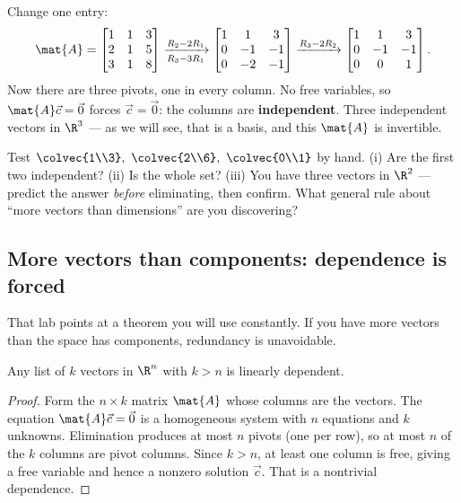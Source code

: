 \begin{example}
\label{ch14:ex-indep3}
Change one entry:
\[
  \mat{A}=\begin{bmatrix} 1 & 1 & 3\\ 2 & 1 & 5\\ 3 & 1 & 8\end{bmatrix}
  \xrightarrow[R_3-3R_1]{R_2-2R_1}
  \begin{bmatrix} 1 & 1 & 3\\ 0 & -1 & -1\\ 0 & -2 & -1\end{bmatrix}
  \xrightarrow{R_3-2R_2}
  \begin{bmatrix} 1 & 1 & 3\\ 0 & -1 & -1\\ 0 & 0 & 1\end{bmatrix}.
\]
Now there are three pivots, one in every column. No free variables, so
$\mat{A}\vec{c}=\vec{0}$ forces $\vec{c}=\vec{0}$: the columns are
\textbf{independent}. Three independent vectors in $\R^3$ --- as we will see,
that is a basis, and this $\mat{A}$ is invertible.
\end{example}

\begin{labbox}
Test $\colvec{1\\3},\ \colvec{2\\6},\ \colvec{0\\1}$ by hand. (i) Are the first
two independent? (ii) Is the whole set? (iii) You have three vectors in $\R^2$ ---
predict the answer \emph{before} eliminating, then confirm. What general rule
about ``more vectors than dimensions'' are you discovering?
\end{labbox}

\subsection*{More vectors than components: dependence is forced}

That lab points at a theorem you will use constantly. If you have more vectors
than the space has components, redundancy is unavoidable.

\begin{theorem}
\label{ch14:thm-toomany}
Any list of $k$ vectors in $\R^n$ with $k > n$ is linearly dependent.
\end{theorem}

\begin{proof}
Form the $n \times k$ matrix $\mat{A}$ whose columns are the vectors. The
equation $\mat{A}\vec{c} = \vec{0}$ is a homogeneous system with $n$ equations
and $k$ unknowns. Elimination produces at most $n$ pivots (one per row), so at
most $n$ of the $k$ columns are pivot columns. Since $k > n$, at least one column
is free, giving a free variable and hence a nonzero solution $\vec{c}$. That is a
nontrivial dependence.
\end{proof}

